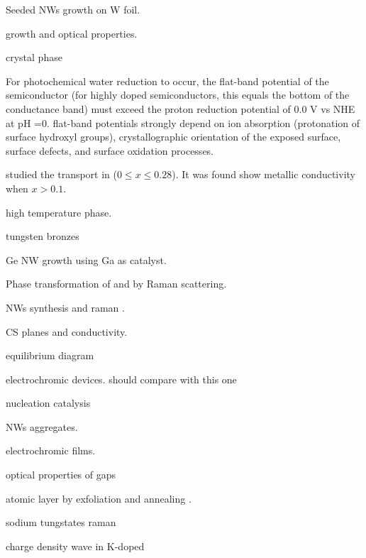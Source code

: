  Seeded  NWs growth on W foil.\cite{Hong2006a}

  growth and optical properties. \cite{Oishi2001} \cite{Itoh2001}

  crystal phase \cite{Viswanathan1974}

 For photochemical water reduction to occur, the flat-band potential of the semiconductor (for highly doped semiconductors, this equals the bottom of the conductance band) must exceed the proton reduction potential of 0.0 V vs NHE at pH =0. \cite{Osterloh2008} flat-band potentials strongly depend on ion absorption (protonation of surface hydroxyl groups), crystallographic orientation of the exposed surface, surface defects, and surface oxidation processes.

\citeauthor{Salje1984} studied the transport in  ($0\leq x \leq 0.28$).\cite{Salje1984} It was found  show metallic conductivity when $x > 0.1$.

  \cite{Migas2010}

  high temperature phase. \cite{Vogt1999}

 tungsten bronzes \cite{Wiseman1976}

 Ge NW growth using Ga as catalyst. \cite{Chandrasekaran2006}

 Phase transformation of  and  by Raman scattering. \cite{Lima2011}

  NWs synthesis and raman \cite{Ma2005}.

  CS planes and conductivity.\cite{Sahle1983}

  equilibrium diagram \cite{Wriedt1989}

  electrochromic devices.\cite{Liu2013d} should compare with this one \cite{Wang2008}

  nucleation catalysis \cite{Turnbull1952}

   NWs aggregates. \cite{Kozan2008a}

  electrochromic films. \cite{Yoshimura1985}

  optical properties of  gaps\cite{Saygin-Hinczewski2008}

   atomic layer by exfoliation and annealing . \cite{Kalantar-zadeh2010a}

  sodium tungstates raman \cite{Redkin2010}

  charge density wave in K-doped  \cite{Raj2008}

